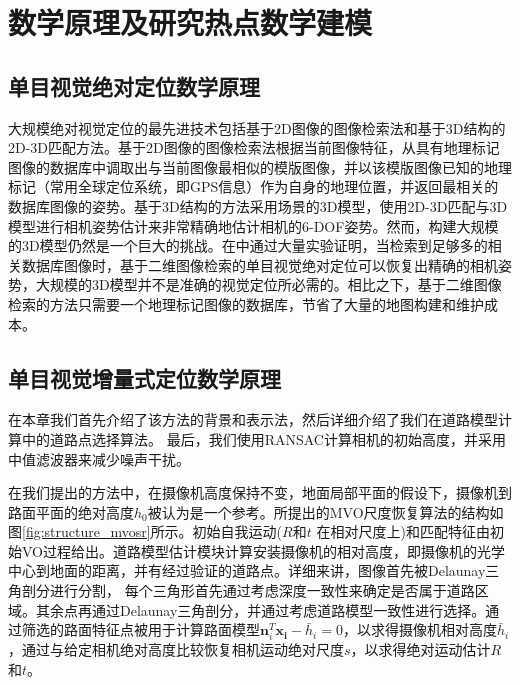 \chapter{数学原理及研究热点数学建模}
\label{ch:principle}
\section{单目视觉绝对定位数学原理}
大规模绝对视觉定位的最先进技术包括基于2D图像的图像检索法和基于3D结构的2D-3D匹配方法。基于2D图像的图像检索法根据当前图像特征，从具有地理标记图像的数据库中调取出与当前图像最相似的模版图像，并以该模版图像已知的地理标记（常用全球定位系统，即GPS信息）作为自身的地理位置，并返回最相关的数据库图像的姿势。基于3D结构的方法采用场景的3D模型，使用2D-3D匹配与3D模型进行相机姿势估计来非常精确地估计相机的6-DOF姿势。然而，构建大规模的3D模型仍然是一个巨大的挑战。在\cite{2017Are}中通过大量实验证明，当检索到足够多的相关数据库图像时，基于二维图像检索的单目视觉绝对定位可以恢复出精确的相机姿势，大规模的3D模型并不是准确的视觉定位所必需的。相比之下，基于二维图像检索的方法只需要一个地理标记图像的数据库，节省了大量的地图构建和维护成本。


\section{单目视觉增量式定位数学原理}
在本章我们首先介绍了该方法的背景和表示法，然后详细介绍了我们在道路模型计算中的道路点选择算法。 最后，我们使用RANSAC计算相机的初始高度，并采用中值滤波器来减少噪声干扰。

在我们提出的方法中，在摄像机高度保持不变，地面局部平面的假设下，摄像机到路面平面的绝对高度$h_0$被认为是一个参考。所提出的MVO尺度恢复算法的结构如图\ref{fig:structure_mvosr}所示。初始自我运动($R$和$t$
在相对尺度上)和匹配特征由初始VO过程给出。道路模型估计模块计算安装摄像机的相对高度，即摄像机的光学中心到地面的距离，并有经过验证的道路点。详细来讲，图像首先被Delaunay三角剖分进行分割，%
每个三角形首先通过考虑深度一致性来确定是否属于道路区域。其余点再通过Delaunay三角剖分，并通过考虑道路模型一致性进行选择。通过筛选的路面特征点被用于计算路面模型$\mathbf{n}^T_i\mathbf{x_i}-\bar{h}_{i}=0$，以求得摄像机相对高度$\bar{h}_i$，通过与给定相机绝对高度比较恢复相机运动绝对尺度$s$，以求得绝对运动估计${R}$和${t}$。

